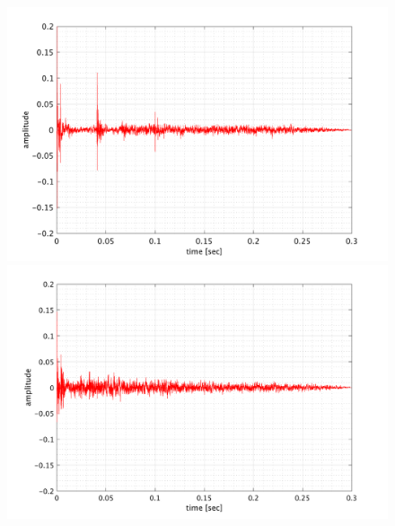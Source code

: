 \documentclass[11pt,a4j]{jreport}
\begin{document}
    \begin{figure}[H]
      \begin{minipage}[b]{.5\linewidth}
          \centering
          \includegraphics[width=.9\linewidth]{images/convolutedIr/ER1.png}
      \end{minipage}%
      \begin{minipage}[b]{.5\linewidth}
          \centering
          \includegraphics[width=.9\linewidth]{images/convolutedIr/ER2.png}
      \end{minipage}


\end{figure}
\end{document}
